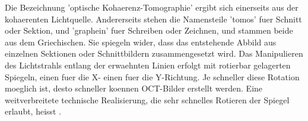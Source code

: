 Die Bezeichnung 'optische Kohaerenz-Tomographie' ergibt sich einerseits aus der kohaerenten Lichtquelle. Andererseits stehen die Namensteile 'tomos' fuer Schnitt oder Sektion, und 'graphein' fuer Schreiben oder Zeichnen, und stammen beide aus dem Griechischen. Sie spiegeln wider, dass das entstehende Abbild aus einzelnen Sektionen oder Schnittbildern zusammengesetzt wird. Das Manipulieren des Lichtstrahls entlang der erwaehnten Linien erfolgt mit rotierbar gelagerten Spiegeln, einen fuer die X- einen fuer die Y-Richtung. Je schneller diese Rotation moeglich ist, desto schneller koennen OCT-Bilder erstellt werden. Eine weitverbreitete technische Realisierung, die sehr schnelles Rotieren der Spiegel erlaubt, heisst \galvo .

